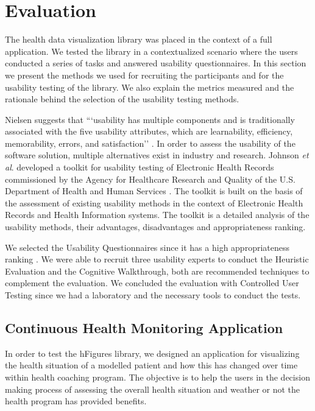 \documentclass[twocolumn]{bmcart}%
\begin{document}
\section*{Evaluation}

The health data visualization library was placed in the context of a full application. We tested the library in a contextualized scenario where the users conducted a series of tasks and answered usability questionnaires. In this section we present the methods we used for recruiting the participants and for the usability testing of the library. We also explain the metrics measured and the rationale behind the selection of the usability testing methods.

Nielsen suggests that ```usability has multiple components and is traditionally associated with the five usability attributes, which are learnability, efficiency, memorability, errors, and satisfaction'' \cite{nielsen1994usability}. In order to assess the usability of the software solution, multiple alternatives exist in industry and research. Johnson \textit{et al}. developed a toolkit for usability testing of Electronic Health Records commissioned by the Agency for Healthcare Research and Quality of the U.S. Department of Health and Human Services \cite{johnson2011ehr}. The toolkit is built on the basis of the assessment of existing usability methods in the context of Electronic Health Records and Health Information systems. The toolkit is a detailed analysis of the usability methods, their advantages, disadvantages and appropriateness ranking.

We selected the Usability Questionnaires since it has a high appropriateness ranking \cite{johnson2011ehr}. We were able to recruit three usability experts to conduct the Heuristic Evaluation and the Cognitive Walkthrough, both are recommended techniques to complement the evaluation. We concluded the evaluation with Controlled User Testing since we had a laboratory and the necessary tools to conduct the tests.

\subsection*{Continuous Health Monitoring Application}

In order to test the hFigures library, we designed an application for visualizing the health situation of a modelled patient and how this has changed over time within health coaching program. The objective is to help the users in the decision making process of assessing the overall health situation and weather or not the health program has provided benefits.
\end{document}
